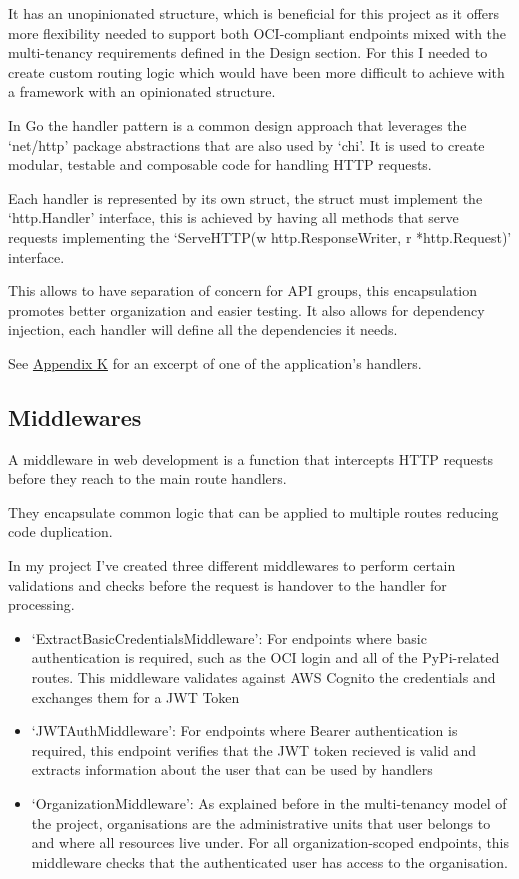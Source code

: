 \documentclass{article}
\begin{document}
  It has an unopinionated structure, which is beneficial for this project as it offers more flexibility needed to support both OCI-compliant endpoints mixed with the multi-tenancy requirements defined in the Design section. For this I needed to create custom routing logic which would have been more difficult to achieve with a framework with an opinionated structure.

  In Go the handler pattern is a common design approach that leverages the `net/http' package abstractions that are also used by `chi'. It is used to create modular, testable and composable code for handling HTTP requests.
  
  Each handler is represented by its own struct, the struct must implement the `http.Handler' interface, this is achieved by having all methods that serve requests implementing the `ServeHTTP(w http.ResponseWriter, r *http.Request)' interface.

  This allows to have separation of concern for API groups, this encapsulation promotes better organization and easier testing. It also allows for dependency injection, each handler will define all the dependencies it needs.

  See \hyperref[sec:appendix-k]{Appendix K} for an excerpt of one of the application's handlers.

  \subsection{Middlewares}

  A middleware in web development is a function that intercepts HTTP requests before they reach to the main route handlers.

  They encapsulate common logic that can be applied to multiple routes reducing code duplication.

  In my project I've created three different middlewares to perform certain validations and checks before the request is handover to the handler for processing.

  \begin{itemize}
    \item `ExtractBasicCredentialsMiddleware': For endpoints where basic authentication is required, such as the OCI login and all of the PyPi-related routes. This middleware validates against AWS Cognito the credentials and exchanges them for a JWT Token
    \item `JWTAuthMiddleware': For endpoints where Bearer authentication is required, this endpoint verifies that the JWT token recieved is valid and extracts information about the user that can be used by handlers
    \item `OrganizationMiddleware': As explained before in the multi-tenancy model of the project, organisations are the administrative units that user belongs to and where all resources live under. For all organization-scoped endpoints, this middleware checks that the authenticated user has access to the organisation.
  \end{itemize}
  
\end{document}
